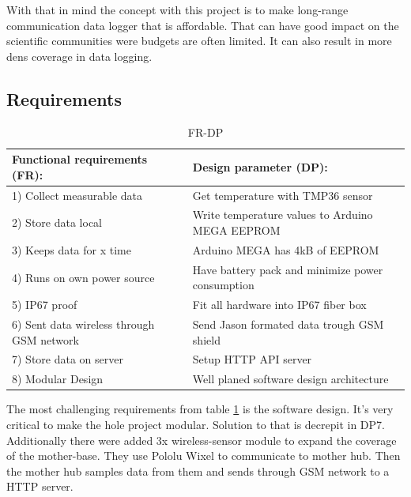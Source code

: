 With that in mind the concept with this project is to make long-range communication data logger that is affordable. That can have good impact on the scientific communities were budgets are often limited. It can also result in more dens coverage in data logging. 

\subsection{Requirements}
\begin{table}[h!]
	\caption{FR-DP}
	\label{tbl:FRDP}
\begin{tabular}{|p{8cm}|p{8cm}|}
		\hline \textbf{Functional requirements (FR):} & \textbf{Design parameter (DP):} \\ 
		\hline 1) Collect measurable data &   Get temperature with TMP36 sensor\\
		\hline 2) Store data local &   Write temperature values to Arduino MEGA EEPROM \\
		\hline 3) Keeps data for x time &  Arduino MEGA \cite{arduinoMega} has 4kB of EEPROM \\
		\hline 4) Runs on own power source & Have battery pack and minimize power consumption \\ 
		\hline 5) IP67 proof &   Fit all hardware into IP67 fiber box\\
		\hline 6) Sent data wireless through GSM network & Send Jason formated data trough GSM shield \\ 
		\hline 7) Store data on server & Setup HTTP API server \\ 
		\hline 8) Modular Design & Well planed software design architecture \\ 
		\hline
	\end{tabular}
\end{table}

The most challenging requirements from table \ref{tbl:FRDP} is the software design. It's very critical to make the hole project modular. Solution to that is decrepit in DP7. Additionally there were added 3x wireless-sensor module to expand the coverage of the mother-base. They use Pololu Wixel to communicate to mother hub. Then the mother hub samples data from them and sends through GSM network to a HTTP server.


